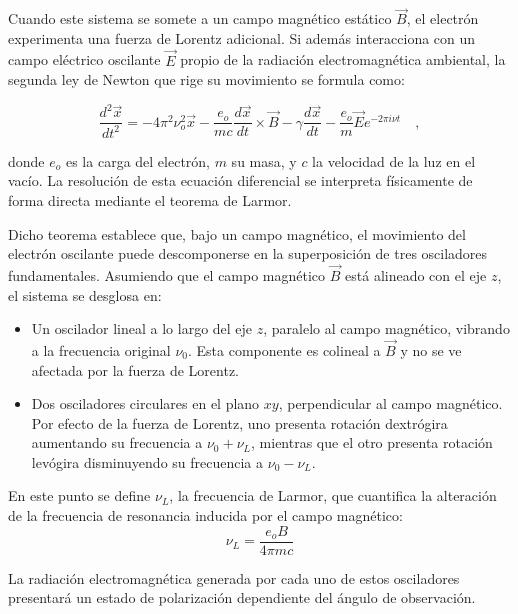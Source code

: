 Cuando este sistema se somete a un campo magnético estático $\vec{B}$, el electrón experimenta una fuerza de Lorentz adicional. Si además interacciona con un campo eléctrico oscilante $\vec{E}$ propio de la radiación electromagnética ambiental, la segunda ley de Newton que rige su movimiento se formula como:

\begin{equation}
    \label{eq:segLeyNewton}
    \frac{d^2\vec{x}}{dt^2} = -4\pi^2\nu_o^2\vec{x} - \frac{e_o}{mc}\frac{d\vec{x}}{dt}\times\vec{B} - \gamma\frac{d\vec{x}}{dt} - \frac{e_o}{m}\vec{E}e^{-2\pi i\nu t} \quad,
\end{equation}

donde $e_o$ es la carga del electrón, $m$ su masa, y $c$ la velocidad de la luz en el vacío. La resolución de esta ecuación diferencial se interpreta físicamente de forma directa mediante el teorema de Larmor. 

Dicho teorema establece que, bajo un campo magnético, el movimiento del electrón oscilante puede descomponerse en la superposición de tres osciladores fundamentales. Asumiendo que el campo magnético $\vec{B}$ está alineado con el eje $z$, el sistema se desglosa en:
\begin{itemize}
    \item Un oscilador lineal a lo largo del eje $z$, paralelo al campo magnético, vibrando a la frecuencia original $\nu_0$. Esta componente es colineal a $\vec{B}$ y no se ve afectada por la fuerza de Lorentz.
    \item Dos osciladores circulares en el plano $xy$, perpendicular al campo magnético. Por efecto de la fuerza de Lorentz, uno presenta rotación dextrógira aumentando su frecuencia a $\nu_0 + \nu_L$, mientras que el otro presenta rotación levógira disminuyendo su frecuencia a $\nu_0 - \nu_L$. 
\end{itemize}

En este punto se define $\nu_L$, la frecuencia de Larmor, que cuantifica la alteración de la frecuencia de resonancia inducida por el campo magnético:
\begin{equation}
    \label{eq:larmorFrec}
    \nu_L = \frac{e_o B}{4\pi m c}
\end{equation}

La radiación electromagnética generada por cada uno de estos osciladores presentará un estado de polarización dependiente del ángulo de observación.

